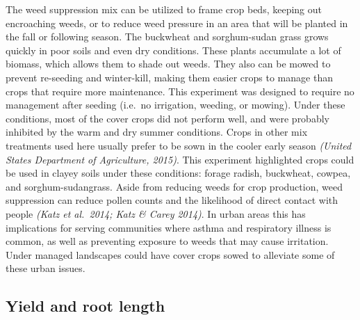 \documentclass[
]{article}
\begin{document}
\hfill\break

The weed suppression mix can be utilized to frame crop beds, keeping out encroaching weeds, or to reduce weed pressure in an area that will be planted in the fall or following season.
The buckwheat and sorghum-sudan grass grows quickly in poor soils and even dry conditions.
These plants accumulate a lot of biomass, which allows them to shade out weeds.
They also can be mowed to prevent re-seeding and winter-kill, making them easier crops to manage than crops that require more maintenance.
This experiment was designed to require no management after seeding (i.e.~no irrigation, weeding, or mowing).
Under these conditions, most of the cover crops did not perform well, and were probably inhibited by the warm and dry summer conditions.
Crops in other mix treatments used here usually prefer to be sown in the cooler early season \emph{(United States Department of Agriculture, 2015)}.
This experiment highlighted crops could be used in clayey soils under these conditions: forage radish, buckwheat, cowpea, and sorghum-sudangrass.
Aside from reducing weeds for crop production, weed suppression can reduce pollen counts and the likelihood of direct contact with people \emph{(Katz et al.~2014; Katz \& Carey 2014)}.
In urban areas this has implications for serving communities where asthma and respiratory illness is common, as well as preventing exposure to weeds that may cause irritation.
Under managed landscapes could have cover crops sowed to alleviate some of these urban issues.

\hypertarget{yield-and-root-length}{%
\subsection{Yield and root length}\label{yield-and-root-length}}
\end{document}
